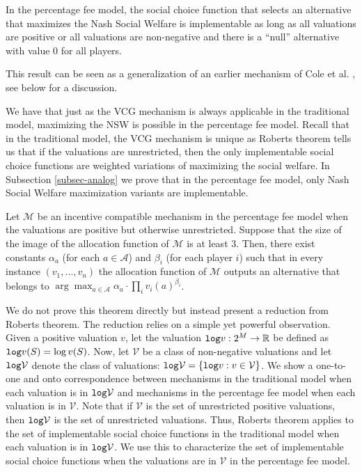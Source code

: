 \documentclass{article}
\newcommand{\R}{\mathbb{R}}
\newcommand{\cM}{{\mathcal M}}
\newcommand{\cV}{{\mathcal V}}
\begin{document}
\begin{theorem*}
In the percentage fee model, the social choice function that selects an alternative that maximizes the Nash Social Welfare is implementable as long as all valuations are positive or all valuations are non-negative and there is a ``null'' alternative with value $0$ for all players. 
\end{theorem*}

{This result can be seen as a generalization of an earlier mechanism of Cole et al. \cite{CGG13}, see below for a discussion.}



We have that just as the VCG mechanism is always applicable in the traditional model, maximizing the NSW is  possible in the percentage fee model. Recall that in the traditional model, the VCG mechanism is unique as Roberts theorem tells us that if the valuations are unrestricted, then the only implementable social choice functions are weighted variations of maximizing the social welfare. In Subsection \ref{subsec-analog} we prove that in the percentage fee model, only Nash Social Welfare maximization variants are implementable.


\begin{theorem*}
Let $\mathcal M$ be an incentive compatible mechanism in the percentage fee model when the valuations are positive but otherwise unrestricted. Suppose that the size of the image of the allocation function of $\cM$ is at least $3$. Then, there exist constants $\alpha_a$ (for each $a\in \mathcal A$) and $\beta_i$ (for each player $i$) such that in every instance $(v_1,\ldots, v_n)$ the allocation function of $\cM$ outputs an alternative that belongs to $\arg\max_{a\in \mathcal A}\alpha_a\cdot \prod_iv_i(a)^{\beta_i}$. 
\end{theorem*}

 We do not prove this theorem directly but instead present a reduction from Roberts theorem. The reduction relies on a simple yet powerful observation. 
Given a positive valuation $v$, let the valuation ${\tt log} v:2^M \to \R$ be defined as ${\tt log} v(S) = \log v(S)$. Now, let $\cV$ be a class of non-negative valuations and let ${\tt log} \cV$ denote the class of valuations: $ {\tt log} \cV = \{ {\tt log} v: v \in \cV \}$. We show a one-to-one and onto correspondence between mechanisms in the traditional model when each valuation is in ${\tt log} \cV$ and mechanisms in the percentage fee model when each valuation is in $\cV$. Note that if $\cV$ is the set of unrestricted positive valuations, then ${\tt log} \cV$ is the set of unrestricted valuations. Thus, Roberts theorem applies to the set of implementable social choice functions in the traditional model when each valuation is in ${\tt log} \cV$. We use this to characterize the set of implementable social choice functions when the valuations are in $\cV$ in the percentage fee model. 
\end{document}
